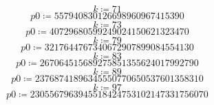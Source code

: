 \documentclass{article}
\begin{document}
\begin{dmath*}
k \coloneqq 71
\end{dmath*}
\vspace{-\bigskipamount}
\begin{dmath*}
\mathit{p0} \coloneqq 557940830126698960967415390
\end{dmath*}
\vspace{-\bigskipamount}
\begin{dmath*}
k \coloneqq 73
\end{dmath*}
\vspace{-\bigskipamount}
\begin{dmath*}
\mathit{p0} \coloneqq 40729680599249024150621323470
\end{dmath*}
\vspace{-\bigskipamount}
\begin{dmath*}
k \coloneqq 79
\end{dmath*}
\vspace{-\bigskipamount}
\begin{dmath*}
\mathit{p0} \coloneqq 3217644767340672907899084554130
\end{dmath*}
\vspace{-\bigskipamount}
\begin{dmath*}
k \coloneqq 83
\end{dmath*}
\vspace{-\bigskipamount}
\begin{dmath*}
\mathit{p0} \coloneqq 267064515689275851355624017992790
\end{dmath*}
\vspace{-\bigskipamount}
\begin{dmath*}
k \coloneqq 89
\end{dmath*}
\vspace{-\bigskipamount}
\begin{dmath*}
\mathit{p0} \coloneqq 23768741896345550770650537601358310
\end{dmath*}
\vspace{-\bigskipamount}
\begin{dmath*}
k \coloneqq 97
\end{dmath*}
\vspace{-\bigskipamount}
\begin{dmath*}
\mathit{p0} \coloneqq 2305567963945518424753102147331756070
\end{dmath*}
\end{document}
